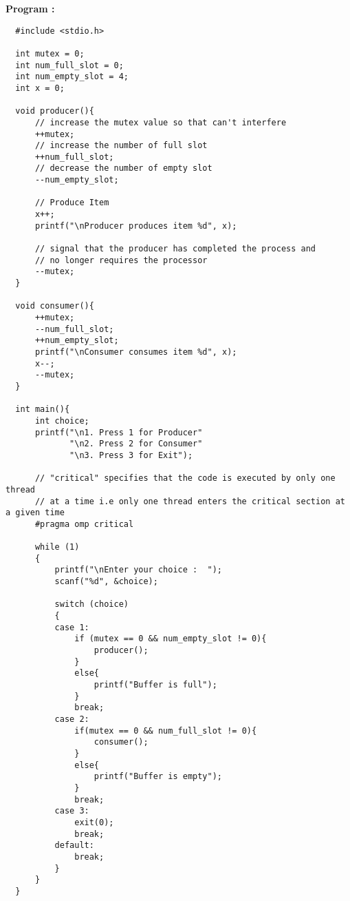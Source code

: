 \documentclass[journal,onecolumn]{IEEEtran}
\begin{document}
\textbf{Program : }
\begin{verbatim}
  #include <stdio.h>

  int mutex = 0;
  int num_full_slot = 0;
  int num_empty_slot = 4;
  int x = 0;
  
  void producer(){
      // increase the mutex value so that can't interfere 
      ++mutex;
      // increase the number of full slot
      ++num_full_slot;
      // decrease the number of empty slot
      --num_empty_slot;
      
      // Produce Item
      x++;
      printf("\nProducer produces item %d", x);
      
      // signal that the producer has completed the process and 
      // no longer requires the processor
      --mutex;
  }
  
  void consumer(){
      ++mutex;
      --num_full_slot;
      ++num_empty_slot;
      printf("\nConsumer consumes item %d", x);
      x--;
      --mutex;
  }
  
  int main(){
      int choice;
      printf("\n1. Press 1 for Producer"
             "\n2. Press 2 for Consumer"
             "\n3. Press 3 for Exit");
      
      // "critical" specifies that the code is executed by only one thread 
      // at a time i.e only one thread enters the critical section at a given time
      #pragma omp critical
  
      while (1)
      {
          printf("\nEnter your choice :  ");
          scanf("%d", &choice);
  
          switch (choice)
          {
          case 1:
              if (mutex == 0 && num_empty_slot != 0){
                  producer();
              }
              else{
                  printf("Buffer is full");
              }
              break;
          case 2:
              if(mutex == 0 && num_full_slot != 0){
                  consumer();
              }
              else{
                  printf("Buffer is empty");
              }
              break;
          case 3:
              exit(0);
              break;
          default:
              break;
          }
      }
  }
\end{verbatim}
\end{document}
